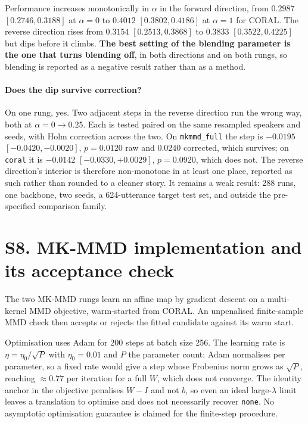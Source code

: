 \documentclass[a4paper,fleqn]{cas-dc}
\begin{document}
Performance increases monotonically in $\alpha$ in the forward direction, from
$0.2987$ $[0.2746, 0.3188]$ at $\alpha = 0$ to $0.4012$ $[0.3802, 0.4186]$ at
$\alpha = 1$ for CORAL. The reverse direction rises from $0.3154$
$[0.2513, 0.3868]$ to $0.3833$ $[0.3522, 0.4225]$ but dips before it climbs.
\textbf{The best setting of the blending parameter is the one that turns
blending off}, in both directions and on both rungs, so blending is reported as
a negative result rather than as a method.

\paragraph{Does the dip survive correction?} On one rung, yes. Two adjacent steps
in the reverse direction run the wrong way, both at
$\alpha = 0 \rightarrow 0.25$. Each is tested paired on the same resampled
speakers and seeds, with Holm correction across the two. On \texttt{mkmmd\_full}
the step is $-0.0195$ $[-0.0420, -0.0020]$, $p = 0.0120$ raw and $0.0240$
corrected, which survives; on \texttt{coral} it is $-0.0142$
$[-0.0330, +0.0029]$, $p = 0.0920$, which does not. The reverse direction's
interior is therefore non-monotone in at least one place, reported as such
rather than rounded to a cleaner story. It remains a weak result: 288 runs, one
backbone, two seeds, a 624-utterance target test set, and outside the
pre-specified comparison family.

\section*{S8. MK-MMD implementation and its acceptance check}
\label{sec:s-mkmmd}

The two MK-MMD rungs learn an affine map by gradient descent on a multi-kernel
MMD objective, warm-started from CORAL. An unpenalised finite-sample MMD check
then accepts or rejects the fitted candidate against its warm start.

Optimisation uses Adam \cite{kingma2015adam} for 200 steps at batch size 256.
The learning rate is $\eta = \eta_0 / \sqrt{P}$ with $\eta_0 = 0.01$ and $P$ the
parameter count: Adam normalises per parameter, so a fixed rate would give a
step whose Frobenius norm grows as $\sqrt{P}$, reaching $\approx 0.77$ per
iteration for a full $W$, which does not converge. The identity anchor in the
objective penalises $W - I$ and not $b$, so even an ideal large-$\lambda$ limit
leaves a translation to optimise and does not necessarily recover
\texttt{none}. No asymptotic optimisation guarantee is claimed for the
finite-step procedure.
\end{document}
